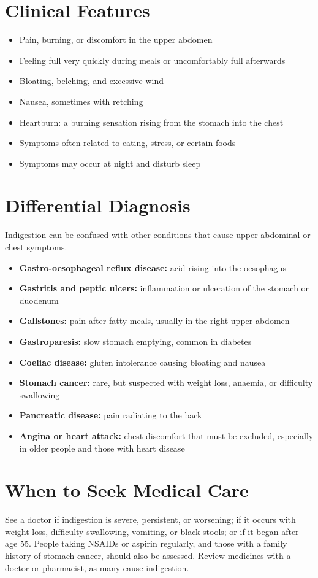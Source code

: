 \section*{Clinical Features}
\begin{itemize}
    \item Pain, burning, or discomfort in the upper abdomen
    \item Feeling full very quickly during meals or uncomfortably full afterwards
    \item Bloating, belching, and excessive wind
    \item Nausea, sometimes with retching
    \item Heartburn: a burning sensation rising from the stomach into the chest
    \item Symptoms often related to eating, stress, or certain foods
    \item Symptoms may occur at night and disturb sleep
\end{itemize}

\section*{Differential Diagnosis}
Indigestion can be confused with other conditions that cause upper abdominal or chest symptoms.
\begin{itemize}
    \item \textbf{Gastro-oesophageal reflux disease:} acid rising into the oesophagus
    \item \textbf{Gastritis and peptic ulcers:} inflammation or ulceration of the stomach or duodenum
    \item \textbf{Gallstones:} pain after fatty meals, usually in the right upper abdomen
    \item \textbf{Gastroparesis:} slow stomach emptying, common in diabetes
    \item \textbf{Coeliac disease:} gluten intolerance causing bloating and nausea
    \item \textbf{Stomach cancer:} rare, but suspected with weight loss, anaemia, or difficulty swallowing
    \item \textbf{Pancreatic disease:} pain radiating to the back
    \item \textbf{Angina or heart attack:} chest discomfort that must be excluded, especially in older people and those with heart disease
\end{itemize}

\section*{When to Seek Medical Care}
See a doctor if indigestion is severe, persistent, or worsening; if it occurs with weight loss, difficulty swallowing, vomiting, or black stools; or if it began after age 55. People taking NSAIDs or aspirin regularly, and those with a family history of stomach cancer, should also be assessed. Review medicines with a doctor or pharmacist, as many cause indigestion.

